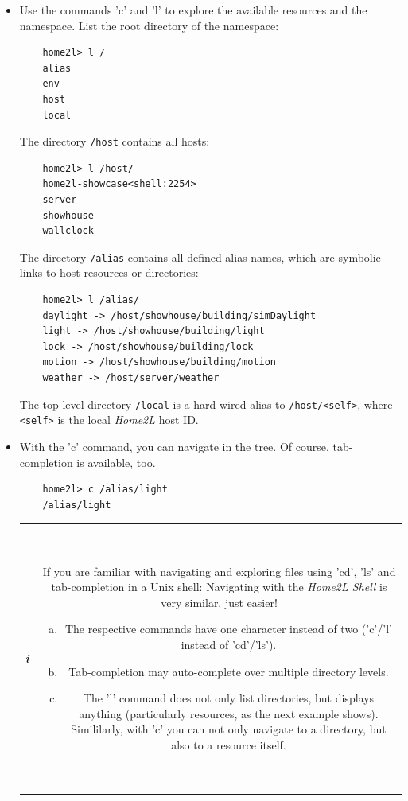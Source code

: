 \documentclass[12pt,english,parskip=half]{scrreprt}
\newcommand{\infobox}[1]{
  \hfill
  \setlength\arrayrulewidth{1pt}
  \begin{tabular}[t]{c|c|}
    \parbox{1.8em}{\hfill\textit{\Huge\textbf{i}\,}}
    &
    \,\parbox{0.89\linewidth}{\setlength{\parskip}{0.5em}#1}\,
  \end{tabular}
  \par
}
\begin{document}
\begin{itemize}[$\blacktriangleright$]
\item
  Use the commands 'c' and 'l' to explore the available resources and the namespace.
  List the root directory of the namespace:
  \begin{lstlisting}
    home2l> l /
    alias
    env
    host
    local
  \end{lstlisting}

  The directory \texttt{/host} contains all hosts:
  \begin{lstlisting}
    home2l> l /host/
    home2l-showcase<shell:2254>
    server
    showhouse
    wallclock
  \end{lstlisting}

  The directory \texttt{/alias} contains all defined alias names, which are symbolic
  links to host resources or directories:
  \begin{lstlisting}
    home2l> l /alias/
    daylight -> /host/showhouse/building/simDaylight
    light -> /host/showhouse/building/light
    lock -> /host/showhouse/building/lock
    motion -> /host/showhouse/building/motion
    weather -> /host/server/weather
  \end{lstlisting}

  The top-level directory \texttt{/local} is a hard-wired alias to
  \texttt{/host/<self>}, where \texttt{<self>} is the local
  \emph{Home2L} host ID.

\item
  With the 'c' command, you can navigate in the tree. Of course,
  tab-completion is available, too.
  \begin{lstlisting}
    home2l> c /alias/light
    /alias/light
  \end{lstlisting}

  \infobox{
    If you are familiar with navigating and exploring files using 'cd', 'ls' and
    tab-completion in a Unix shell: Navigating with the \emph{Home2L Shell} is very
    similar, just easier!
    \begin{enumerate}[a)]
      \item The respective commands have one character instead of two ('c'/'l' instead of 'cd'/'ls').
      \item Tab-completion may auto-complete over multiple directory levels.
      \item The 'l' command does not only list directories, but displays anything (particularly resources, as the next example shows). Simililarly, with 'c' you can not only
        navigate to a directory, but also to a resource itself.
    \end{enumerate}
  }


\end{itemize}
\end{document}
